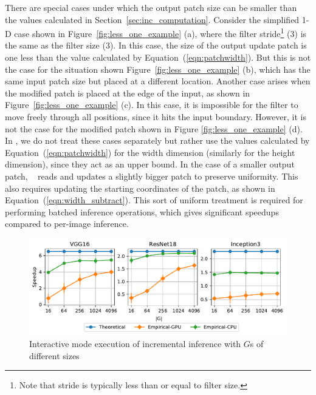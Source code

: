 There are special cases under which the output patch size can be smaller than the values calculated in Section~\ref{sec:inc_computation}. Consider the simplified 1-D case shown in Figure~\ref{fig:less_one_example} (a), where the filter stride\footnote{Note that stride is typically less than or equal to filter size.} (3) is the same as the filter size (3). In this case, the size of the output update patch is one less than the value calculated by Equation~(\ref{eqn:patchwidth}). But this is not the case for the situation shown Figure~\ref{fig:less_one_example} (b), which has the same input patch size but placed at a different location.
Another case arises when the modified patch is placed at the edge of the input, as shown in Figure~\ref{fig:less_one_example} (c). In this case, it is impossible for the filter to move freely through all positions, since it hits the input boundary. However, it is not the case for the modified patch shown in Figure \ref{fig:less_one_example} (d). In \system, we do not treat these cases separately but rather use the values calculated by Equation~(\ref{eqn:patchwidth}) for the width dimension (similarly for the height dimension), since they act as an upper bound. In the case of a smaller output patch, \system~ reads and updates a slightly bigger patch to preserve uniformity. This also requires updating the starting coordinates of the patch, as shown in Equation~(\ref{eqn:width_subtract}). This sort of uniform treatment is required for performing batched inference operations, which gives significant speedups compared to per-image inference.

\begin{figure}[t]
\includegraphics[width=\columnwidth]{images/interactive_experiment.pdf}
\vspace{-8mm}
\caption{Interactive mode execution of incremental inference with $G$s of different sizes}
\label{fig:interactive_experiment}
\end{figure}


